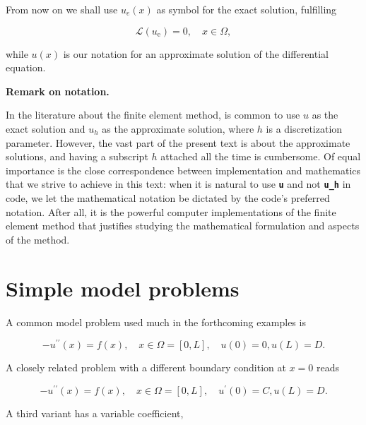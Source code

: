 \documentclass[../main.tex]{subfiles}
\begin{document}
	From now on we shall use $u_{e}(x)$ as symbol for the exact solution, fulfilling
	
	\begin{equation}
		\label{eqa126}
		\mathcal{L}\left(u_{\mathrm{e}}\right)=0, \quad x \in \Omega,
	\end{equation}
	
	\noindent while $u(x)$ is our notation for an approximate solution of the differential equation.
	
	\begin{mybox}
		\textbf{Remark on notation.}
		
		\noindent In the literature about the finite element method, is common to use $u$ as the exact solution and $u_{h}$ as the approximate solution, where $h$ is a discretization parameter. However, the vast part of the present text is about the approximate solutions, and having a subscript $h$ attached all the time is cumbersome. Of equal importance is the close correspondence between implementation and mathematics that we strive to achieve in this text: when it is natural to use \textbf{\texttt{u}} and not \textbf{\texttt{u\_h}} in code, we let the mathematical notation be dictated by the code's preferred notation. After all, it is the powerful computer implementations of the finite element method that justifies studying the mathematical formulation and aspects of the method.	
	\end{mybox}
	
	\section[Basic principles for approximating differential equations]{Simple model problems}
	\label{sec:sec_11_2}
	\noindent A common model problem used much in the forthcoming examples is
	
	\begin{equation}
		\label{eqa127}
		-u^{\prime \prime}(x)=f(x), \quad x \in \Omega=[0, L], \quad u(0)=0, u(L)=D .
	\end{equation}

	\noindent A closely related problem with a different boundary condition at $x=0$ reads
	
	\begin{equation}
		\label{eqa128}
		-u^{\prime \prime}(x)=f(x), \quad x \in \Omega=[0, L], \quad u^{\prime}(0)=C, u(L)=D .
	\end{equation}

	\noindent A third variant has a variable coefficient,
	
\end{document}
